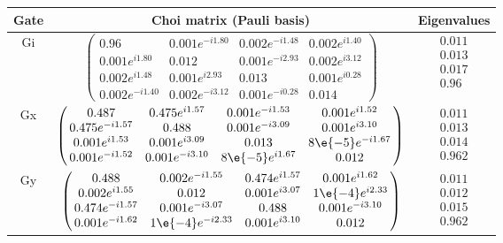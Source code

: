 {\begin{table}[h]
\begin{center}
\begin{tabular}[l]{|c|c|c|}
\hline
Gate & Choi matrix (Pauli basis) & Eigenvalues \\ \hline
Gi & $ \left(\!\!\begin{array}{cccc}
0.96 & 0.001e^{-i1.80} & 0.002e^{-i1.48} & 0.002e^{i1.40} \\ 
0.001e^{i1.80} & 0.012 & 0.001e^{-i2.93} & 0.002e^{i3.12} \\ 
0.002e^{i1.48} & 0.001e^{i2.93} & 0.013 & 0.001e^{i0.28} \\ 
0.002e^{-i1.40} & 0.002e^{-i3.12} & 0.001e^{-i0.28} & 0.014
 \end{array}\!\!\right) $
 & $ \begin{array}{c}
0.011 \\ 
0.013 \\ 
0.017 \\ 
0.96
 \end{array} $
 \\ \hline
Gx & $ \left(\!\!\begin{array}{cccc}
0.487 & 0.475e^{i1.57} & 0.001e^{-i1.53} & 0.001e^{i1.52} \\ 
0.475e^{-i1.57} & 0.488 & 0.001e^{-i3.09} & 0.001e^{i3.10} \\ 
0.001e^{i1.53} & 0.001e^{i3.09} & 0.013 & 8\e{-5}e^{-i1.67} \\ 
0.001e^{-i1.52} & 0.001e^{-i3.10} & 8\e{-5}e^{i1.67} & 0.012
 \end{array}\!\!\right) $
 & $ \begin{array}{c}
0.011 \\ 
0.013 \\ 
0.014 \\ 
0.962
 \end{array} $
 \\ \hline
Gy & $ \left(\!\!\begin{array}{cccc}
0.488 & 0.002e^{-i1.55} & 0.474e^{i1.57} & 0.001e^{i1.62} \\ 
0.002e^{i1.55} & 0.012 & 0.001e^{i3.07} & 1\e{-4}e^{i2.33} \\ 
0.474e^{-i1.57} & 0.001e^{-i3.07} & 0.488 & 0.001e^{-i3.10} \\ 
0.001e^{-i1.62} & 1\e{-4}e^{-i2.33} & 0.001e^{i3.10} & 0.012
 \end{array}\!\!\right) $
 & $ \begin{array}{c}
0.011 \\ 
0.012 \\ 
0.015 \\ 
0.962
 \end{array} $
 \\ \hline
\end{tabular}


\end{center}
\end{table}}
